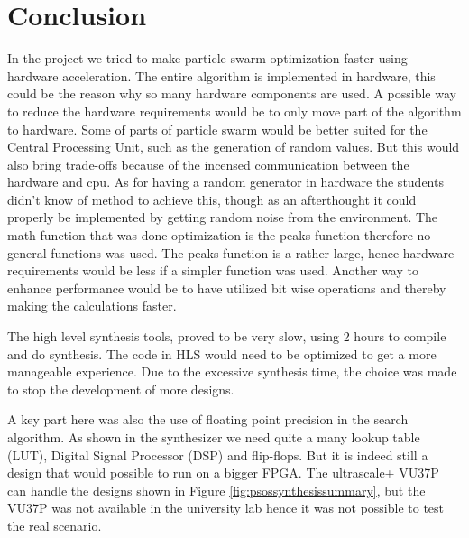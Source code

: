 \section{Conclusion}\label{sc:conclusion}
In the project we tried to make particle swarm optimization faster using hardware acceleration. 
The entire algorithm is implemented in hardware, this could be the reason why so many hardware components are used. A possible way to reduce the hardware requirements would be to only move part of the algorithm to hardware. Some of parts of particle swarm would be better suited for the Central Processing Unit, such as the generation of random values. But this would also bring trade-offs because of the incensed communication between the hardware and cpu. As for having a random generator in hardware the students didn't know of method to achieve this, though as an afterthought it could properly be implemented by getting random noise from the environment.
The math function that was done optimization is the peaks function therefore no general functions was used. The peaks function is a rather large, hence hardware requirements would be less if a simpler function was used. Another way to enhance performance would be to have utilized bit wise operations and thereby making the calculations faster.

The high level synthesis tools, proved to be very slow, using 2 hours to compile and do synthesis. The code in HLS would need to be optimized to get a more manageable experience. Due to the excessive synthesis time, the choice was made to stop the development of more designs.

A key part here was also the use of floating point precision in the search algorithm. As shown in the synthesizer we need quite a many lookup table (LUT), Digital Signal Processor (DSP) and flip-flops. But it is indeed still a design that would possible to run on a bigger FPGA. The ultrascale+ VU37P can handle the designs shown in Figure \ref{fig:psossynthesissummary}, but the VU37P was not available in the university lab hence it was not possible to test the real scenario. 

